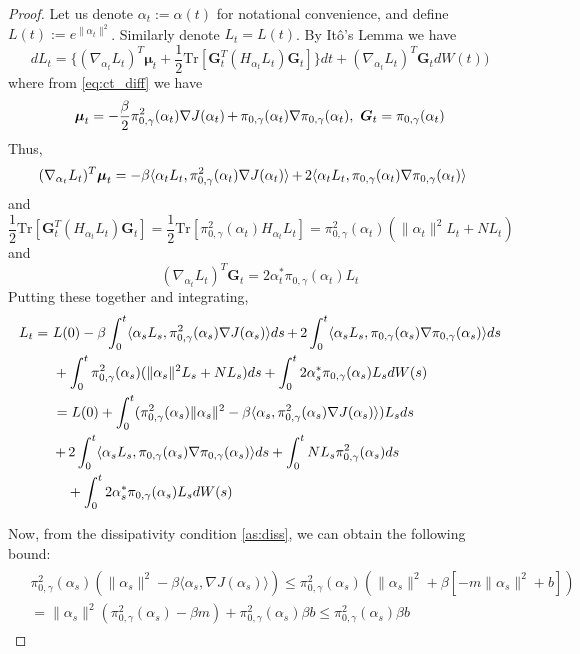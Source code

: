 \documentclass[journal,onecolumn]{IEEEtran}
\newcommand{\grad}{\nabla}
\newcommand{\rew}{J}
\newcommand{\alt}{\alpha(t)}
\newcommand{\alts}{\alpha_t}
\newcommand{\altss}{\alpha_s}
\newcommand{\Lt}{L_t}
\newcommand{\Lss}{L_s}
\newcommand{\brownt}{W(t)}
\newcommand{\browns}{W(s)}
\newcommand{\dimn}{N}
\newcommand{\ids}{\pi}
\newcommand{\idw}{\gamma}
\newcommand{\isp}{0,\idw}
\newcommand{\dissm}{m}
\newcommand{\dissb}{b}
\newcommand{\idistrw}{\ids_{\isp}}
\begin{document}
{\begin{proof}
Let us denote $\alts := \alt$ for notational convenience, and define $L(t) := e^{\|\alts\|^2}$. Similarly denote $\Lt = L(t)$. By It\^o's Lemma we have 
\[d\Lt = \{(\grad_{\alts}\Lt)^T\boldsymbol{\mu}_t + \frac{1}{2}\textrm{Tr}[\boldsymbol{G}_t^T(H_{\alts}\Lt)\boldsymbol{G}_t]\}dt + (\grad_{\alts}\Lt)^T\boldsymbol{G}_td\brownt)\]
where from \eqref{eq:ct_diff} we have 
\[\boldsymbol{\mu}_t = -\frac{\beta}{2}\idistrw^2(\alts)\grad \rew(\alts) \,\color{black}{+}\, \idistrw(\alts)\grad \idistrw(\alts), \ \boldsymbol{G}_t = \idistrw(\alts)\]
Thus,
\begin{align*}
    \begin{split}
        &(\grad_{\alts}\Lt)^T\boldsymbol{\mu}_t = - \beta \langle \alts \Lt ,\idistrw^2(\alts)\grad \rew(\alts) \rangle \,\color{black}{+}\, 2 \langle \alts \Lt , \idistrw(\alts)\grad \idistrw(\alts) \rangle
    \end{split}
\end{align*}
and 
\[\frac{1}{2}\textrm{Tr}[\boldsymbol{G}_t^T(H_{\alts}\Lt)\boldsymbol{G}_t] = \frac{1}{2}\textrm{Tr}[\idistrw^2(\alts)H_{\alts}\Lt] = \idistrw^2(\alts)(\|\alts\|^2\Lt + \dimn \Lt)\]
and
\[(\grad_{\alts}\Lt)^T\boldsymbol{G}_t = 2\alts^{*}\idistrw(\alts)\Lt\]
Putting these together and integrating,
\begin{align*}
    \begin{split}
        \Lt = \ &L(0) - \beta \int_0^t \langle \altss \Lss ,\idistrw^2(\altss)\grad \rew(\altss) \rangle ds \,\color{black}{+}\, 2 \int_0^t \langle  \altss \Lss , \idistrw(\altss)\grad \idistrw(\altss) \rangle ds \\
        & + \int_0^t \idistrw^2(\altss)(\|\altss\|^2\Lss + \dimn \Lss) ds + \int_0^t 2\altss^{*}\idistrw(\altss)\Lss d\browns \\
        & = L(0) + \int_0^t (\idistrw^2(\altss)\|\altss\|^2 - \beta \langle \altss,\idistrw^2(\altss)\grad \rew(\altss) \rangle) \Lss ds \\
        &\,\color{black}{+}\, 2 \int_0^t \langle  \altss \Lss , \idistrw(\altss)\grad \idistrw(\altss) \rangle ds + \int_0^t \dimn \Lss \idistrw^2(\altss) ds \\&\quad + \int_0^t 2\altss^{*}\idistrw(\altss)\Lss d\browns
    \end{split}
\end{align*}

Now, from the dissipativity condition \ref{as:diss}, we can obtain the following bound:
\begin{align*}
    \begin{split}
        &\idistrw^2(\altss)(\|\altss\|^2 - \beta\langle \altss,\grad \rew(\altss) \rangle)  \leq \idistrw^2(\altss)(\|\altss\|^2 + \beta[-\dissm\|\altss\|^2 + \dissb]) \\
        & = \|\altss\|^2(\idistrw^2(\altss) - \beta \dissm) + \idistrw^2(\altss)\beta \dissb \leq \idistrw^2(\altss)\beta \dissb 
    \end{split}
\end{align*} 


\end{proof}}
\end{document}
